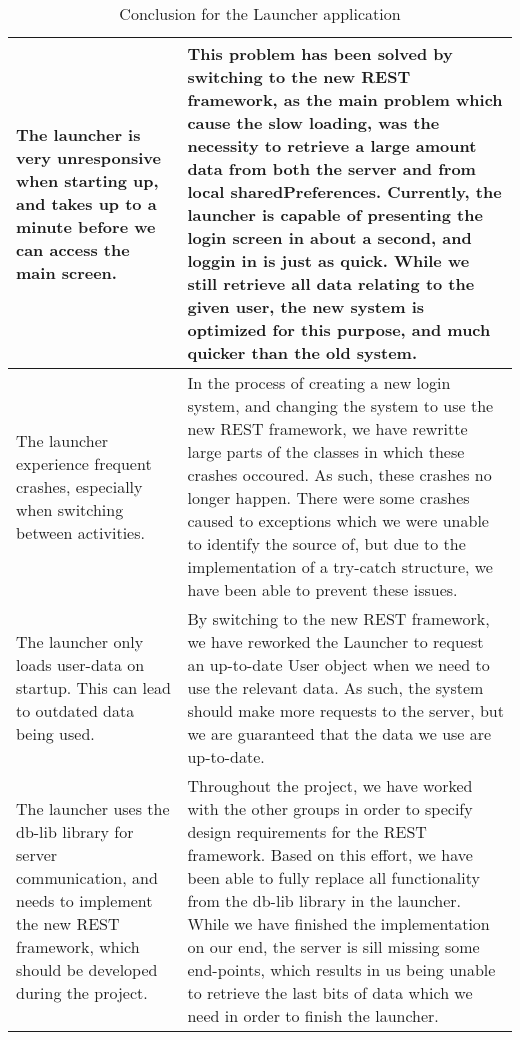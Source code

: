 \begin{table}[H]
\centering
\begin{tabular}{|l|l|}
\hline
The launcher is very unresponsive when starting up, and takes up to a minute
before we can access the main screen. &  This problem has been solved by
switching to the new REST framework, as the main problem which cause the slow
loading, was the necessity to retrieve a large amount data from both the server
and from local sharedPreferences. Currently, the launcher is capable of
presenting the login screen in about a second, and loggin in is just as quick.
While we still retrieve all data relating to the given user, the new system is
optimized for this purpose, and much quicker than the old system. \\\hline
The launcher experience frequent crashes, especially when switching between
activities. & In the process of creating a new login system, and changing the
system to use the new REST framework, we have rewritte large parts of the
classes in which these crashes occoured. As such, these crashes no longer
happen. There were some crashes caused to exceptions which we were unable to
identify the source of, but due to the implementation of a try-catch structure,
we have been able to prevent these issues. \\\hline 
The launcher only loads user-data on startup. This can lead to outdated data
being used. & By switching to the new REST framework, we have reworked the
Launcher to request an up-to-date User object when we need to use the relevant
data. As such, the system should make more requests to the server, but we are
guaranteed that the data we use are up-to-date. \\\hline
The launcher uses the db-lib library for server communication, and needs to
implement the new REST framework, which should be developed during the project.
& Throughout the project, we have worked with the other groups in order to
specify design requirements for the REST framework. Based on this effort, we
have been able to fully replace all functionality from the db-lib library in the
launcher. While we have finished the implementation on our end, the server is
sill missing some end-points, which results in us being unable to retrieve the
last bits of data which we need in order to finish the launcher. \\\hline
\end{tabular}
\caption{Conclusion for the Launcher application} 
\label{LConcT}    
\end{table} 
